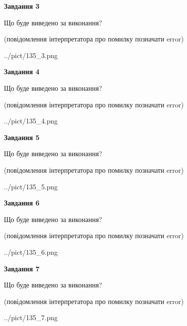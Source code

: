 \documentclass[12pt, ukrainian]{article}
\begin{document}
{\begin {large}
{\begin {center}\textbf{Завдання 3}\end {center}}\par
Що буде виведено за виконання?\par
 (повідомлення інтерпретатора про помилку позначати error)\par
\begin{center}
	{../pict/135_3.png}
\end{center}
\newpage

{\begin {center}\textbf{Завдання 4}\end {center}}\par
Що буде виведено за виконання?\par
 (повідомлення інтерпретатора про помилку позначати error)\par
\begin{center}
	{../pict/135_4.png}
\end{center}
\newpage

{\begin {center}\textbf{Завдання 5}\end {center}}\par
Що буде виведено за виконання?\par
 (повідомлення інтерпретатора про помилку позначати error)\par
\begin{center}
	{../pict/135_5.png}
\end{center}
\newpage

{\begin {center}\textbf{Завдання 6}\end {center}}\par
Що буде виведено за виконання?\par
 (повідомлення інтерпретатора про помилку позначати error)\par
\begin{center}
	{../pict/135_6.png}
\end{center}
\newpage

{\begin {center}\textbf{Завдання 7}\end {center}}\par
Що буде виведено за виконання?\par
 (повідомлення інтерпретатора про помилку позначати error)\par
\begin{center}
	{../pict/135_7.png}
\end{center}
\newpage


\end{large}}
\end{document}
